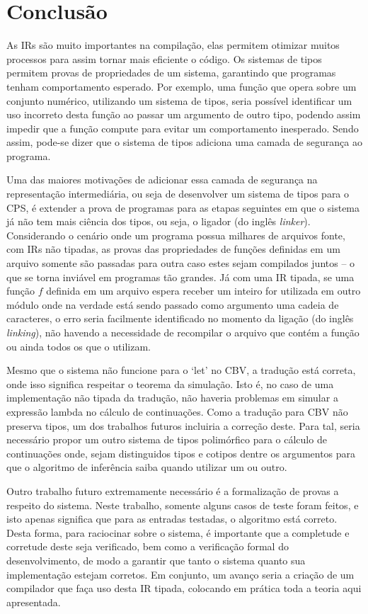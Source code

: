 \section{Conclusão}\label{sec:conclusao}
As IRs são muito importantes na compilação, elas permitem otimizar muitos processos para assim tornar mais eficiente o código.
Os sistemas de tipos permitem provas de propriedades de um sistema, garantindo que programas tenham comportamento esperado.
Por exemplo, uma função que opera sobre um conjunto numérico, utilizando um sistema de tipos, seria possível identificar um uso incorreto desta função ao passar um argumento de outro tipo, podendo assim impedir que a função compute para evitar um comportamento inesperado.
Sendo assim, pode-se dizer que o sistema de tipos adiciona uma camada de segurança ao programa.

Uma das maiores motivações de adicionar essa camada de segurança na representação intermediária, ou seja de desenvolver um sistema de tipos para o CPS, é extender a prova de programas para as etapas seguintes em que o sistema já não tem mais ciência dos tipos, ou seja, o ligador (do inglês \textit{linker}).
Considerando o cenário onde um programa possua milhares de arquivos fonte, com IRs não tipadas, as provas das propriedades de funções definidas em um arquivo somente são passadas para outra caso estes sejam compilados juntos -- o que se torna inviável em programas tão grandes.
Já com uma IR tipada, se uma função $f$ definida em um arquivo espera receber um inteiro for utilizada em outro módulo onde na verdade está sendo passado como argumento uma cadeia de caracteres, o erro seria facilmente identificado no momento da ligação (do inglês \textit{linking}), não havendo a necessidade de recompilar o arquivo que contém a função ou ainda todos os que o utilizam.

Mesmo que o sistema não funcione para o `let' no CBV, a tradução está correta, onde isso significa respeitar o teorema da simulação.
Isto é, no caso de uma implementação não tipada da tradução, não haveria problemas em simular a expressão lambda no cálculo de continuações.
Como a tradução para CBV não preserva tipos, um dos trabalhos futuros incluiria a correção deste.
Para tal, seria necessário propor um outro sistema de tipos polimórfico para o cálculo de continuações onde, sejam distinguidos tipos e cotipos dentre os argumentos para que o algoritmo de inferência saiba quando utilizar um ou outro.

Outro trabalho futuro extremamente necessário é a formalização de provas a respeito do sistema.
Neste trabalho, somente alguns casos de teste foram feitos, e isto apenas significa que para as entradas testadas, o algoritmo está correto.
Desta forma, para raciocinar sobre o sistema, é importante que a completude e corretude deste seja verificado, bem como a verificação formal do desenvolvimento, de modo a garantir que tanto o sistema quanto sua implementação estejam corretos.
Em conjunto, um avanço seria a criação de um compilador que faça uso desta IR tipada, colocando em prática toda a teoria aqui apresentada.
